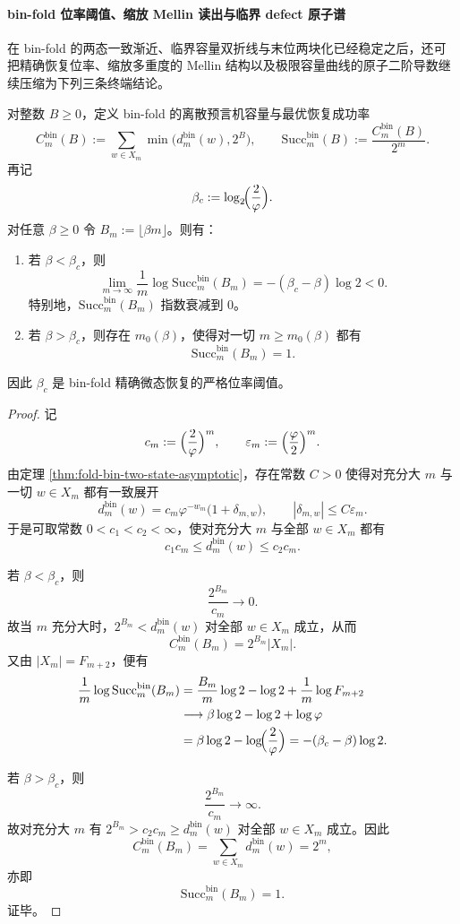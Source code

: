 \paragraph{bin-fold 位率阈值、缩放 Mellin 读出与临界 defect 原子谱}
在 bin-fold 的两态一致渐近、临界容量双折线与末位两块化已经稳定之后，还可把精确恢复位率、缩放多重度的 Mellin 结构以及极限容量曲线的原子二阶导数继续压缩为下列三条终端结论。

\begin{theorem}\label{thm:xi-binfold-oracle-success-bitrate-threshold-exact}
对整数 \(B\ge 0\)，定义 bin-fold 的离散预言机容量与最优恢复成功率
\[
C_m^{\mathrm{bin}}(B)
:=
\sum_{w\in X_m}\min\bigl(d_m^{\mathrm{bin}}(w),2^B\bigr),
\qquad
\mathrm{Succ}_m^{\mathrm{bin}}(B):=\frac{C_m^{\mathrm{bin}}(B)}{2^m}.
\]
再记
\[
\beta_c:=\log_2\!\Bigl(\frac{2}{\varphi}\Bigr).
\]
对任意 \(\beta\ge 0\) 令 \(B_m:=\lfloor \beta m\rfloor\)。则有：
\begin{enumerate}
\item 若 \(\beta<\beta_c\)，则
\[
\lim_{m\to\infty}\frac{1}{m}\log \mathrm{Succ}_m^{\mathrm{bin}}(B_m)
=
-(\beta_c-\beta)\log 2<0.
\]
特别地，\(\mathrm{Succ}_m^{\mathrm{bin}}(B_m)\) 指数衰减到 \(0\)。
\item 若 \(\beta>\beta_c\)，则存在 \(m_0(\beta)\)，使得对一切 \(m\ge m_0(\beta)\) 都有
\[
\mathrm{Succ}_m^{\mathrm{bin}}(B_m)=1.
\]
\end{enumerate}
因此 \(\beta_c\) 是 bin-fold 精确微态恢复的严格位率阈值。
\end{theorem}
\begin{proof}
记
\[
c_m:=\Bigl(\frac{2}{\varphi}\Bigr)^m,
\qquad
\varepsilon_m:=\Bigl(\frac{\varphi}{2}\Bigr)^m.
\]
由定理 \ref{thm:fold-bin-two-state-asymptotic}，存在常数 \(C>0\) 使得对充分大 \(m\) 与一切 \(w\in X_m\) 都有一致展开
\[
d_m^{\mathrm{bin}}(w)=c_m\varphi^{-w_m}\bigl(1+\delta_{m,w}\bigr),
\qquad
|\delta_{m,w}|\le C\varepsilon_m.
\]
于是可取常数 \(0<c_1<c_2<\infty\)，使对充分大 \(m\) 与全部 \(w\in X_m\) 都有
\[
c_1c_m\le d_m^{\mathrm{bin}}(w)\le c_2c_m.
\]

若 \(\beta<\beta_c\)，则
\[
\frac{2^{B_m}}{c_m}\longrightarrow 0.
\]
故当 \(m\) 充分大时，\(2^{B_m}<d_m^{\mathrm{bin}}(w)\) 对全部 \(w\in X_m\) 成立，从而
\[
C_m^{\mathrm{bin}}(B_m)=2^{B_m}|X_m|.
\]
又由 \(|X_m|=F_{m+2}\)，便有
\[
\begin{aligned}
\frac{1}{m}\log \mathrm{Succ}_m^{\mathrm{bin}}(B_m)
&=
\frac{B_m}{m}\log 2-\log 2+\frac{1}{m}\log F_{m+2}\\
&\longrightarrow
\beta\log 2-\log 2+\log\varphi\\
&=
\beta\log 2-\log\!\Bigl(\frac{2}{\varphi}\Bigr)
=
-(\beta_c-\beta)\log 2.
\end{aligned}
\]

若 \(\beta>\beta_c\)，则
\[
\frac{2^{B_m}}{c_m}\longrightarrow \infty.
\]
故对充分大 \(m\) 有 \(2^{B_m}>c_2c_m\ge d_m^{\mathrm{bin}}(w)\) 对全部 \(w\in X_m\) 成立。因此
\[
C_m^{\mathrm{bin}}(B_m)=\sum_{w\in X_m}d_m^{\mathrm{bin}}(w)=2^m,
\]
亦即
\[
\mathrm{Succ}_m^{\mathrm{bin}}(B_m)=1.
\]
证毕。
\end{proof}

